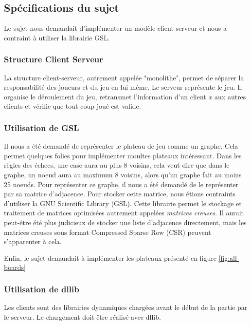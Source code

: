 \subsection{Spécifications du sujet}
Le sujet nous demandait d'implémenter un modèle client-serveur et nous a
contraint à utiliser la librairie GSL.

\subsubsection{Structure Client Serveur}

La structure client-serveur, autrement appelée "monolithe", permet de séparer
la responsabilité des joueurs et du jeu en lui même. Le serveur représente le jeu. Il organise le
déroulement du jeu, retransmet l'information d'un client $x$ aux autres clients et vérifie que tout coup joué est valide.

\subsubsection{Utilisation de GSL}

Il nous a été demandé de représenter le plateau de jeu comme un graphe. 
Cela permet quelques folies pour implémenter moultes plateaux intéressant.
Dans les règles des échecs, une case aura au plus 8 voisins, cela veut dire que dans le graphe, un noeud aura au maximum 8 voisins, alors qu'un graphe fait au moins 25 noeuds.
Pour représenter ce graphe, il nous a été demandé de le représenter par sa matrice d'adjacence. 
Pour stocker cette matrice, nous étions contraints d'utiliser la GNU Scientific Library (GSL).
Cette librairie permet le stockage et traitement de matrices optimisées autrement appelées \textit{matrices creuses}.
Il aurait peut-être été plus judicieux de stocker une liste d'adjacence directement, mais les matrices creuses sous format Compressed Sparse Row (CSR) peuvent s'apparenter à cela.

Enfin, le sujet demandait à implémenter les plateaux présenté en figure \ref{fig:all-boards}

\begin{figure}
	
\end{figure}

\subsubsection{Utilisation de dllib}

Les clients sont des librairies dynamiques chargées avant le début de la partie par le serveur.
Le chargement doit être réalisé avec dllib.